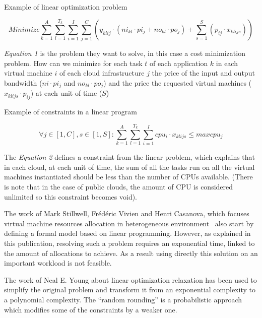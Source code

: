 \documentclass[a4paper,11pt]{article}
\begin{document}
\begin{figequation}
	\caption{Example of linear optimization problem}
	\[
		Minimize
		\sum_{k=1}^A \sum_{l=1}^{T_k} \sum_{i=1}^I \sum_{j=1}^C ( y_{klij} \cdot (ni_{kl} \cdot {pi_j} + no_{kl} \cdot po_j) + \sum_{s=1}^S ( p_{ij} \cdot x_{klijs} ))
	\]
\end{figequation}

\textit{Equation 1} is the problem they want to solve, in this case a cost
minimization problem. How can we minimize for each task $t$ of each application
$k$ in each virtual machine $i$ of each cloud infrastructure $j$ the price of
the input and output bandwidth ($ni \cdot pi_j$ and $no_{kl} \cdot po_j$) and
the price the requested virtual machines ($x_{klijs} \cdot p_{ij}$) at each
unit of time ($S$)

\begin{figequation}
	\caption{Example of constraints in a linear program}
	\[
		\forall j \in [1,C], s \in [1,S]:
		\sum_{k=1}^{A} \sum_{l=1}^{T_k} \sum_{i=1}^{I} cpu_i \cdot x_{klijs} \leq maxcpu_j
	\]
\end{figequation}

The \textit{Equation 2} defines a constraint from the linear problem, which
explains that in each cloud, at each unit of time, the sum of all the tasks run
on all the virtual machines instantiated should be less than the number of CPUs
available.  (There is note that in the case of public clouds, the amount of CPU
is considered unlimited so this constraint becomes void).

\vspace{1em}

The work of Mark Stillwell, Frédéric Vivien and Henri Casanova, which
focuses virtual machine resources allocation in heterogeneous
environment~\cite{allocation:heterogeneous} also start by defining a formal
model based on linear programming. However, as explained in this publication,
resolving such a problem requires an exponential time, linked to the amount of
allocations to achieve. As a result using directly this solution on an
important workload is not feasible.

\vspace{1em}

The work of Neal E. Young about linear optimization
relaxation\cite{maths:rrndlp} has been used to simplify the original problem
and transform it from an exponential complexity to a polynomial complexity. The
“random rounding” is a probabilistic approach which modifies some of the
constraints by a weaker one.
\end{document}
